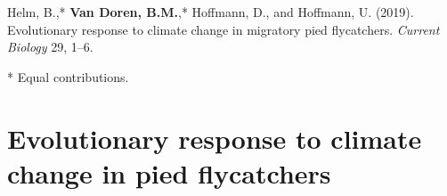 \documentclass[a4paper, nobind]{templates/ociamthesis}
\begin{document}
\begin{savequote}
Helm, B.,* \textbf{Van Doren, B.M.},* Hoffmann, D., and Hoffmann, U.
(2019). Evolutionary response to climate change in migratory pied
flycatchers. \emph{Current Biology} 29, 1--6.

\begin{scriptsize} * Equal contributions. \end{scriptsize}
\end{savequote}

\hypertarget{flycatchers}{%
\chapter{Evolutionary response to climate change in pied flycatchers}\label{flycatchers}}


\newpage
\end{document}
